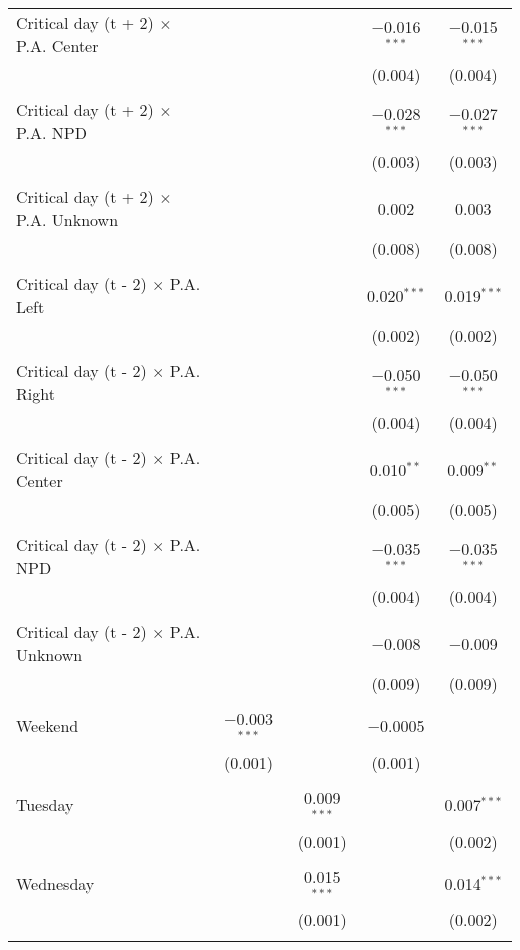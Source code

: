 \documentclass[
]{article}
\begin{document}
\begin{table}[!htbp]
{\begin{tabular}{@{\extracolsep{5pt}}lcccc}
 Critical day (t + 2) $\times$ P.A. Center &  &  & $-$0.016$^{***}$ & $-$0.015$^{***}$ \\ 
  &  &  & (0.004) & (0.004) \\ 
  & & & & \\ 
 Critical day (t + 2) $\times$ P.A. NPD &  &  & $-$0.028$^{***}$ & $-$0.027$^{***}$ \\ 
  &  &  & (0.003) & (0.003) \\ 
  & & & & \\ 
 Critical day (t + 2) $\times$ P.A. Unknown &  &  & 0.002 & 0.003 \\ 
  &  &  & (0.008) & (0.008) \\ 
  & & & & \\ 
 Critical day (t - 2) $\times$ P.A. Left &  &  & 0.020$^{***}$ & 0.019$^{***}$ \\ 
  &  &  & (0.002) & (0.002) \\ 
  & & & & \\ 
 Critical day (t - 2) $\times$ P.A. Right &  &  & $-$0.050$^{***}$ & $-$0.050$^{***}$ \\ 
  &  &  & (0.004) & (0.004) \\ 
  & & & & \\ 
 Critical day (t - 2) $\times$ P.A. Center &  &  & 0.010$^{**}$ & 0.009$^{**}$ \\ 
  &  &  & (0.005) & (0.005) \\ 
  & & & & \\ 
 Critical day (t - 2) $\times$ P.A. NPD &  &  & $-$0.035$^{***}$ & $-$0.035$^{***}$ \\ 
  &  &  & (0.004) & (0.004) \\ 
  & & & & \\ 
 Critical day (t - 2) $\times$ P.A. Unknown &  &  & $-$0.008 & $-$0.009 \\ 
  &  &  & (0.009) & (0.009) \\ 
  & & & & \\ 
 Weekend & $-$0.003$^{***}$ &  & $-$0.0005 &  \\ 
  & (0.001) &  & (0.001) &  \\ 
  & & & & \\ 
 Tuesday &  & 0.009$^{***}$ &  & 0.007$^{***}$ \\ 
  &  & (0.001) &  & (0.002) \\ 
  & & & & \\ 
 Wednesday &  & 0.015$^{***}$ &  & 0.014$^{***}$ \\ 
  &  & (0.001) &  & (0.002) \\ 
  & & & & \\ 

\end{tabular}}
\end{table}
\end{document}
